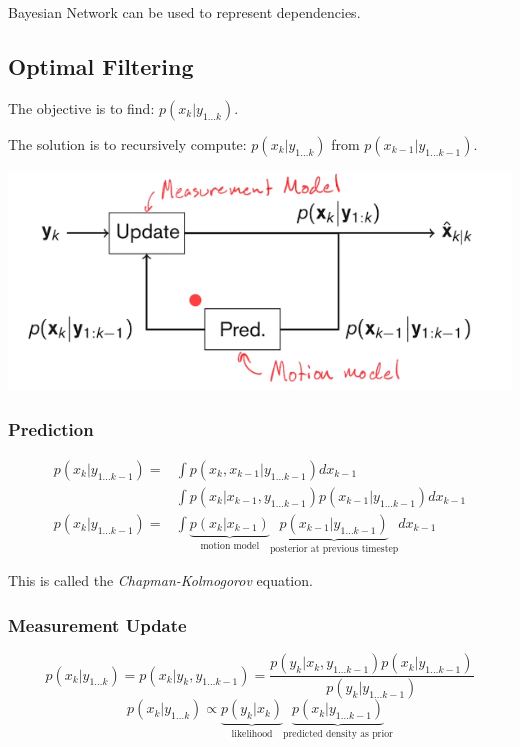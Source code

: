Bayesian Network can be used to represent dependencies.



\subsection{Optimal Filtering}
The objective is to find: $p(x_k | y_{1 \dots k})$.

The solution is to recursively compute: $p(x_k | y_{1\dots k})$ from $p(x_{k-1} | y_{1\dots k-1})$.

\includegraphics[scale=0.5]{content/Optimal_Filtering.png}

\subsubsection{Prediction}

\begin{align}
    p(x_k|y_{1\dots k-1}) = &  \int p(x_k, x_{k-1} | y_{1\dots k-1}) dx_{k-1} \\
     & \int p(x_k | x_{k-1}, y_{1\dots k-1}) p(x_{k-1} | y_{1\dots k-1}) dx_{k-1} \\
    p(x_k|y_{1\dots k-1}) =  & \int \underbrace{p(x_k | x_{k-1})}_\text{motion model} \underbrace{p(x_{k-1} | y_{1 \dots k-1})}_\text{posterior at previous timestep} dx_{k-1}
\end{align}


This is called the \textit{Chapman-Kolmogorov} equation.
\subsubsection{Measurement Update}
\begin{equation}
    p(x_k|y_{1\dots k}) = p(x_k | y_k, y_{1\dots k-1}) = \frac{p(y_k | x_k, y_{1\dots k-1}) p(x_k | y_{1\dots k-1})}{p(y_k | y_{1\dots k-1})}
\end{equation}
\begin{equation}
    p(x_k| y_{1\dots k}) \propto \underbrace{p(y_k | x_k)}_\text{likelihood} \underbrace{p(x_k | y_{1\dots k-1})}_\text{predicted density as prior}
\end{equation}

